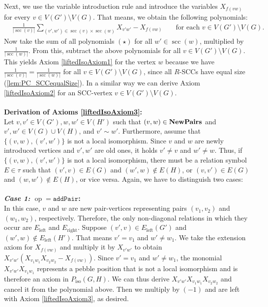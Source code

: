\documentclass[a4paper,UKenglish,cleveref, autoref, thm-restate]{lipics-v2021}
\newcommand{\Pairs}{\text{\upshape \textbf{NewPairs}}}
\newcommand{\pairOp }{\texttt{addPair}}
\newcommand{\op}{\operatorname{op}}
\newcommand{\scc}{{\operatorname{scc}}}
\newcommand{\Piso}{P_{\text{iso}}}
\begin{document}
	Next, we use the variable introduction rule and introduce the variables $X_{f(vw)}$ for every $v \in V(G') \setminus V(G)$. That means, we obtain the following polynomials:
	\begin{align*}
		&\frac{1}{|\scc(v)|}\sum\limits_{(v',w')\in \scc(v) \times \scc(w)} X_{v' w'} - X_{f(vw)} & &\text{ for each } v \in V(G') \setminus V(G).
	\end{align*}
	Now take the sum of all polynomials $(\star)$ for all $w' \in \scc(w)$, multiplied by $\frac{1}{|\scc(w)|}$. From this, subtract the above polynomials for all $v \in V(G') \setminus V(G)$. This yields Axiom \eqref{liftedIsoAxiom1} for the vertex $w$ because we have $\frac{1}{|\scc(v)|} = \frac{1}{|\scc(w)|}$ for all $v \in V(G') \setminus V(G)$, since all $R$-SCCs have equal size (\autoref{lem:PC_SCCequalSize}).
	In a similar way we can derive Axiom \eqref{liftedIsoAxiom2} for an SCC-vertex $v \in V(G') \setminus V(G)$.\\
	\\
\textbf{Derivation of Axioms \eqref{liftedIsoAxiom3}:}\\
Let $v,v' \in V(G'), w,w' \in V(H')$ such that $(v,w) \in \Pairs$ and $v',w' \in V(G) \cup V(H)$, and $v' \sim w'$. Furthermore, assume that $\{(v,w),(v',w')\}$ is not a local isomorphism. Since $v$ and $w$ are newly introduced vertices and $v',w'$ are old ones, it holds $v' \neq v$ and $w' \neq w$. Thus, if $\{(v,w),(v',w')\}$ is not a local isomorphism, there must be a relation symbol $E \in \tau$ such that $(v',v) \in E(G)$ and $(w',w) \notin E(H)$, or $(v,v') \in E(G)$ and $(w,w') \notin E(H)$, or vice versa. Again, we have to distinguish two cases:\\
\\
\textbf{\textit{Case 1:} $\op = \pairOp $:}\\
In this case, $v$ and $w$ are new pair-vertices representing pairs $(v_1,v_2)$ and $(w_1,w_2)$, respectively. Therefore, the only non-diagonal relations in which they occur are $E_{\text{left}}$ and $E_{\text{right}}$. Suppose $(v',v) \in E_{\text{left}}(G')$ and $(w',w) \notin E_{\text{left}}(H')$. That means $v' = v_1$ and $w' \neq w_1$. 
We take the extension axiom for $X_{f(vw)}$ and multiply it by $X_{v'w'}$ to obtain $X_{v'w'}(X_{v_1w_1} X_{v_2w_2} - X_{f(vw)})$.
Since $v' = v_1$ and $w' \neq w_1$, the monomial $X_{v'w'}X_{v_1w_1}$ represents a pebble position that is not a local isomorphism and is therefore an axiom in $\Piso(G,H)$. We can thus derive $X_{v'w'}X_{v_1w_1} X_{v_2w_2}$ and cancel it from the polynomial above. Then we multiply by $(-1)$ and are left with Axiom \eqref{liftedIsoAxiom3}, as desired.
\end{document}
